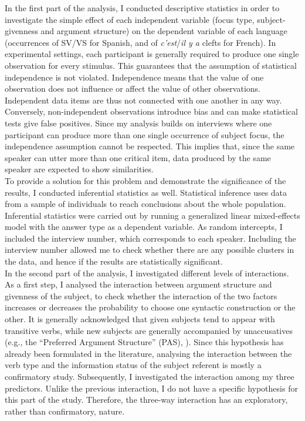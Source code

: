 In the first part of the analysis, I conducted descriptive statistics in order to investigate the simple effect of each independent variable (focus type, subject-givenness and argument structure) on the dependent variable of each language (occurrences of SV/VS for Spanish, and of \textit{c'est}/\textit{il y a} clefts for French).
In experimental settings, each participant is generally required to produce one single observation for every stimulus. This guarantees that the assumption of statistical independence is not violated. Independence means that the value of one observation does not influence or affect the value of other observations. Independent data items are thus not connected with one another in any way. Conversely,  non-independent observations introduce bias and can make statistical tests give false positives. Since my analysis builds on interviews where one participant can produce more than one single occurrence of subject focus, the independence assumption cannot be respected. This implies that, since the same speaker can utter more than one critical item, data produced by the same speaker are expected to show similarities.\\
To provide a solution for this problem and demonstrate the significance of the results, I conducted inferential statistics as well. Statistical inference uses data from a sample of individuals to reach conclusions about the whole population. Inferential statistics were carried out by running a generalized linear mixed-effects model with the answer type as a dependent variable. As random intercepts, I included the interview number, which corresponds to each speaker. Including the interview number allowed me to check whether there are any possible clusters in the data, and hence if the results are statistically significant.\\
In the second part of the analysis, I investigated different levels of interactions. As a first step, I analysed the interaction between argument structure and givenness of the subject, to check whether the interaction of the two factors increases or decreases the probability to choose one syntactic construction or the other. It is generally acknowledged that given subjects tend to appear with transitive verbs, while new subjects are generally accompanied by unaccusatives (e.g., the ``Preferred Argument Structure” (PAS), \cite{du2003preferred}). Since this hypothesis has already been formulated in the literature, analysing the interaction between the verb type and the information status of the subject referent is mostly a confirmatory study. Subsequently, I investigated the interaction among my three predictors. Unlike the previous interaction, I do not have a specific hypothesis for this part of the study. Therefore, the three-way interaction has an exploratory, rather than confirmatory, nature.
